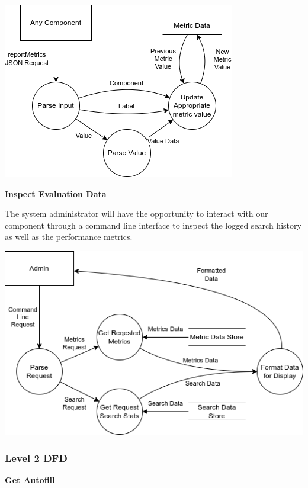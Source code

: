 \begin{center}
  \includegraphics[scale=0.5]{DFDs/LowLevelDFDs-ReportMetric.drawio (1).png}
\end{center}

\textbf{Inspect Evaluation Data}

\medskip

The system administrator will have the opportunity to interact with our component through a command line interface to inspect the logged search history as well as the performance metrics. 

\begin{center}
  \includegraphics[scale=0.5]{DFDs/LowLevelDFDs-AdminView.drawio (1).png}
\end{center}

\subsubsection*{Level 2 DFD}

\textbf{Get Autofill}

